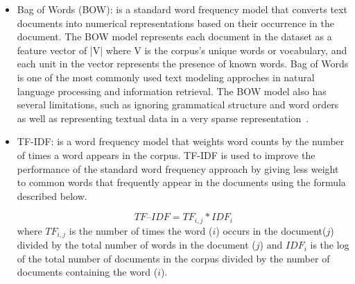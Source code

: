 \documentclass[sn-mathphys,Numbered]{sn-jnl}%
\begin{document}
\begin{itemize}

 \item Bag of Words (BOW): is a standard word frequency model that converts text documents into numerical representations based on their occurrence in the document. The BOW model represents each document in the dataset as a feature vector of |V| where V is the corpus's unique words or vocabulary, and each unit in the vector represents the presence of known words. 
 Bag of Words is one of the most commonly used text modeling approches in natural language processing and information retrieval. The BOW  model also has several limitations, such as ignoring grammatical structure and word orders as well as representing textual data in a very sparse representation~\cite{deepa2019sentiment}.


\item TF-IDF: is a word frequency model that weights word counts by the number of times a word appears in the corpus. TF-IDF is used to improve the performance of the standard word frequency approach by giving less weight to common words that frequently appear in the documents using the formula described below.

\begin{equation}
  TF\textrm{--}IDF = TF_{i,j}*IDF_i  
\end{equation}
where $TF_{i,j}$ is the number of times the word ($i$) occurs in the document($j$) divided by the total number of words in the document ($j$) and $IDF_i$ is the log of the total number of documents in the corpus divided by the number of documents containing the word ($i$). 


\end{itemize}
\end{document}

